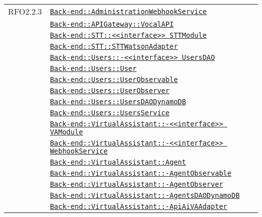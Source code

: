 \begin{longtable}{|>{\centering}m{3cm}|m{10cm}<{\centering}|}
RFO2.2.3 & \hyperref[Back-end::AdministrationWebhookService]{\texttt{Back-end::AdministrationWebhookService}}\\
& \hyperref[Back-end::APIGateway::VocalAPI]{\texttt{Back-end::APIGateway::VocalAPI}}\\
& \hyperref[Back-end::STT::<<interface>> STTModule]{\texttt{Back-end::STT::<<interface>> STTModule}}\\
& \hyperref[Back-end::STT::STTWatsonAdapter]{\texttt{Back-end::STT::STTWatsonAdapter}}\\
& \hyperref[Back-end::Users::<<interface>> UsersDAO]{\texttt{Back-end::Users::-\linebreak <<interface>> UsersDAO}}\\
& \hyperref[Back-end::Users::User]{\texttt{Back-end::Users::User}}\\
& \hyperref[Back-end::Users::UserObservable]{\texttt{Back-end::Users::UserObservable}}\\
& \hyperref[Back-end::Users::UserObserver]{\texttt{Back-end::Users::UserObserver}}\\
& \hyperref[Back-end::Users::UsersDAODynamoDB]{\texttt{Back-end::Users::UsersDAODynamoDB}}\\
& \hyperref[Back-end::Users::UsersService]{\texttt{Back-end::Users::UsersService}}\\
& \hyperref[Back-end::VirtualAssistant::<<interface>> VAModule]{\texttt{Back-end::VirtualAssistant::-\linebreak <<interface>> VAModule}}\\
& \hyperref[Back-end::VirtualAssistant::<<interface>> WebhookService]{\texttt{Back-end::VirtualAssistant::-\linebreak <<interface>> WebhookService}}\\
& \hyperref[Back-end::VirtualAssistant::Agent]{\texttt{Back-end::VirtualAssistant::Agent}}\\
& \hyperref[Back-end::VirtualAssistant::AgentObservable]{\texttt{Back-end::VirtualAssistant::-\linebreak AgentObservable}}\\
& \hyperref[Back-end::VirtualAssistant::AgentObserver]{\texttt{Back-end::VirtualAssistant::-\linebreak AgentObserver}}\\
& \hyperref[Back-end::VirtualAssistant::AgentsDAODynamoDB]{\texttt{Back-end::VirtualAssistant::-\linebreak AgentsDAODynamoDB}}\\
& \hyperref[Back-end::VirtualAssistant::ApiAiVAAdapter]{\texttt{Back-end::VirtualAssistant::-\linebreak ApiAiVAAdapter}}\\

\end{longtable}
